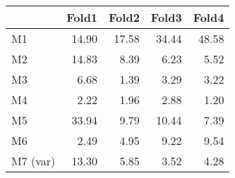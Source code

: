 \begin{tabular}{lrrrr}
\toprule
      & \multicolumn{1}{l}{Fold1} & \multicolumn{1}{l}{Fold2} & \multicolumn{1}{l}{Fold3} & \multicolumn{1}{l}{Fold4} \\
\midrule
M1    &         14.90      &         17.58      &         34.44      &         48.58      \\
M2    &         14.83      &           8.39      &           6.23      &           5.52      \\
M3    &           6.68      &           1.39      &           3.29      &           3.22      \\
M4    &           2.22      &           1.96      &           2.88      &           1.20      \\
M5    &         33.94      &           9.79      &         10.44      &           7.39      \\
M6    &           2.49      &           4.95      &           9.22      &           9.54      \\
M7 (var) &         13.30      &           5.85      &           3.52      &           4.28      \\
\bottomrule
\end{tabular}%

